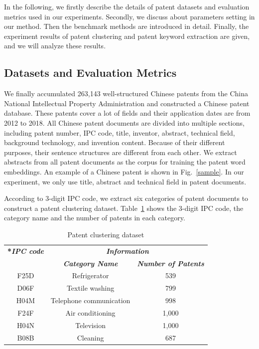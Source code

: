 \documentclass[conference]{IEEEtran}
\begin{document}
	In the following, we firstly describe the details of patent datasets and evaluation metrics used in our experiments. Secondly, we discuss about parameters setting in our method. Then the benchmark methods are introduced in detail. Finally, the experiment results of patent clustering and patent keyword extraction are given, and we will analyze these results.
	\subsection{Datasets and Evaluation Metrics}
	We finally accumulated 263,143 well-structured Chinese patents from the China National Intellectual Property Administration and constructed a Chinese patent database. These patents cover a lot of fields and their application dates are from 2012 to 2018. All Chinese patent documents are divided into multiple sections, including patent number, IPC code, title, inventor, abstract, technical field, background technology, and invention content. Because of their different purposes, their sentence structures are different from each other. We extract abstracts from all patent documents as the corpus for training the patent word embeddings. An example of a Chinese patent is shown in Fig.~\ref{sample}. In our experiment, we only use title, abstract and technical field in patent documents.
	
	According to 3-digit IPC code, we extract six categories of patent documents to construct a patent clustering dataset. Table~\ref{tab1} shows the 3-digit IPC code, the category name and the number of patents in each category. 
	
	\renewcommand\arraystretch{2}
	\begin{table}[htbp]
		\caption{Patent clustering dataset}  
		\label{tab1}
		\begin{center}
			\begin{tabular}{|c|c|c|}
				\hline
				\textbf{\multirow{2}*{\textit{IPC code}}}&\multicolumn{2}{|c|}{\textbf{\textit{Information}}} \\ 
				\cline{2-3}
				& \textbf{\textit{Category Name}}& \textbf{\textit{Number of Patents}} \\
				\hline
				F25D & Refrigerator & 539  \\
				\hline
				D06F & Textile washing & 799  \\
				\hline
				H04M & Telephone communication & 998  \\
				\hline
				F24F & Air conditioning & 1,000  \\
				\hline
				H04N & Television & 1,000  \\
				\hline
				B08B & Cleaning & 687  \\
				\hline	
			\end{tabular}
		\end{center}
	\end{table}
\end{document}

